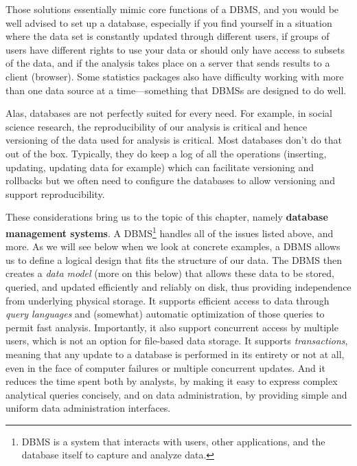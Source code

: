 \documentclass[]{krantz}
\begin{document}
Those solutions essentially mimic core functions of a DBMS, and you
would be well advised to set up a database, especially if you find
yourself in a situation where the data set is constantly updated through
different users, if groups of users have different rights to use your
data or should only have access to subsets of the data, and if the
analysis takes place on a server that sends results to a client
(browser). Some statistics packages also have difficulty working with
more than one data source at a time---something that DBMSs are designed
to do well.

Alas, databases are not perfectly suited for every need. For example, in
social science research, the reproducibility of our analysis is critical
and hence versioning of the data used for analysis is critical. Most
databases don't do that out of the box. Typically, they do keep a log of
all the operations (inserting, updating, updating data for example)
which can facilitate versioning and rollbacks but we often need to
configure the databases to allow versioning and support reproducibility.

These considerations bring us to the topic of this chapter, namely
\textbf{database management systems}. A DBMS\footnote{DBMS is a system
  that interacts with users, other applications, and the database itself
  to capture and analyze data.} handles all of the issues listed above,
and more. As we will see below when we look at concrete examples, a DBMS
allows us to define a logical design that fits the structure of our
data. The DBMS then creates a \emph{data model} (more on this below)
that allows these data to be stored, queried, and updated efficiently
and reliably on disk, thus providing independence from underlying
physical storage. It supports efficient access to data through
\emph{query languages} and (somewhat) automatic optimization of those
queries to permit fast analysis. Importantly, it also support concurrent
access by multiple users, which is not an option for file-based data
storage. It supports \emph{transactions}, meaning that any update to a
database is performed in its entirety or not at all, even in the face of
computer failures or multiple concurrent updates. And it reduces the
time spent both by analysts, by making it easy to express complex
analytical queries concisely, and on data administration, by providing
simple and uniform data administration interfaces.
\end{document}
